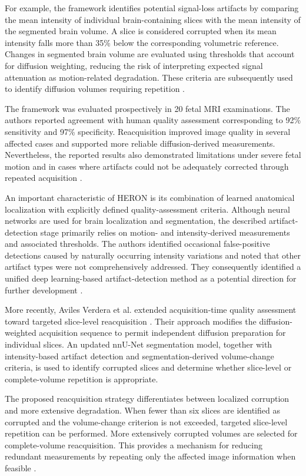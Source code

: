 For example, the framework identifies potential signal-loss artifacts by comparing the mean intensity of individual brain-containing slices with the mean intensity of the segmented brain volume. A slice is considered corrupted when its mean intensity falls more than 35\% below the corresponding volumetric reference. Changes in segmented brain volume are evaluated using thresholds that account for diffusion weighting, reducing the risk of interpreting expected signal attenuation as motion-related degradation. These criteria are subsequently used to identify diffusion volumes requiring repetition \autocite{avilesverdera2025heron}.

The framework was evaluated prospectively in 20 fetal MRI examinations. The authors reported agreement with human quality assessment corresponding to 92\% sensitivity and 97\% specificity. Reacquisition improved image quality in several affected cases and supported more reliable diffusion-derived measurements. Nevertheless, the reported results also demonstrated limitations under severe fetal motion and in cases where artifacts could not be adequately corrected through repeated acquisition \autocite{avilesverdera2025heron}.

An important characteristic of HERON is its combination of learned anatomical localization with explicitly defined quality-assessment criteria. Although neural networks are used for brain localization and segmentation, the described artifact-detection stage primarily relies on motion- and intensity-derived measurements and associated thresholds. The authors identified occasional false-positive detections caused by naturally occurring intensity variations and noted that other artifact types were not comprehensively addressed. They consequently identified a unified deep learning-based artifact-detection method as a potential direction for further development \autocite{avilesverdera2025heron}.

More recently, Aviles Verdera et al. extended acquisition-time quality assessment toward targeted slice-level reacquisition \autocite{avilesverdera2026slicereacquisition}. Their approach modifies the diffusion-weighted acquisition sequence to permit independent diffusion preparation for individual slices. An updated nnU-Net segmentation model, together with intensity-based artifact detection and segmentation-derived volume-change criteria, is used to identify corrupted slices and determine whether slice-level or complete-volume repetition is appropriate.

The proposed reacquisition strategy differentiates between localized corruption and more extensive degradation. When fewer than six slices are identified as corrupted and the volume-change criterion is not exceeded, targeted slice-level repetition can be performed. More extensively corrupted volumes are selected for complete-volume reacquisition. This provides a mechanism for reducing redundant measurements by repeating only the affected image information when feasible \autocite{avilesverdera2026slicereacquisition}.

